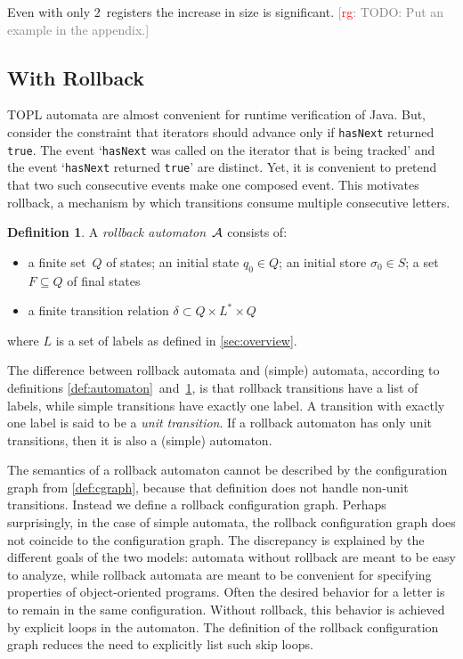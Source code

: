 \documentclass[9pt, preprint]{sigplanconf} %
\newcommand{\noterg}[2]{\textcolor{gray}{[\textcolor{red}{#1}: #2]}}
\newcommand{\rg}[1]{\noterg{rg}{#1}}
\theoremstyle{definition}
\newtheorem{definition}{Definition}
\theoremstyle{remark}
\begin{document}
Even with only $2$~registers the increase in size is significant.
\rg{TODO: Put an example in the appendix.}

\subsection{With Rollback}

TOPL automata are almost convenient for runtime verification of Java.
But, consider the constraint that iterators should advance only if {\tt hasNext} returned {\tt true}.
The event `{\tt hasNext} was called on the iterator that is being tracked' and the event `{\tt hasNext} returned {\tt true}' are distinct.
Yet, it is convenient to pretend that two such consecutive events make one composed event.
This motivates rollback, a mechanism by which transitions consume multiple consecutive letters.

\begin{definition}\label{def:rollback}
A \emph{rollback automaton}~${\cal A}$ consists of:
\begin{itemize}
\item a finite set~$Q$ of states; an initial state $q_0\in Q$; an initial store $\sigma_0\in S$; a set $F\subseteq Q$ of final states
\item a finite transition relation $\delta\subset Q\times L^*\times Q$
\end{itemize}
where $L$ is a set of labels as defined in \autoref{sec:overview}.
\end{definition}

The difference between rollback automata and (simple) automata, according to definitions \ref{def:automaton}~and~\ref{def:rollback}, is that rollback transitions have a list of labels, while simple transitions have exactly one label.
A transition with exactly one label is said to be a \emph{unit transition}.
If a rollback automaton has only unit transitions, then it is also a (simple) automaton.

The semantics of a rollback automaton cannot be described by the configuration graph from \autoref{def:cgraph}, because that definition does not handle non-unit transitions.
Instead we define a rollback configuration graph.
Perhaps surprisingly, in the case of simple automata, the rollback configuration graph does not coincide to the configuration graph.
The discrepancy is explained by the different goals of the two models: automata without rollback are meant to be easy to analyze, while rollback automata are meant to be convenient for specifying properties of object-oriented programs.
Often the desired behavior for a letter is to remain in the same configuration.
Without rollback, this behavior is achieved by explicit loops in the automaton.
The definition of the rollback configuration graph reduces the need to explicitly list such skip loops.
\end{document}

